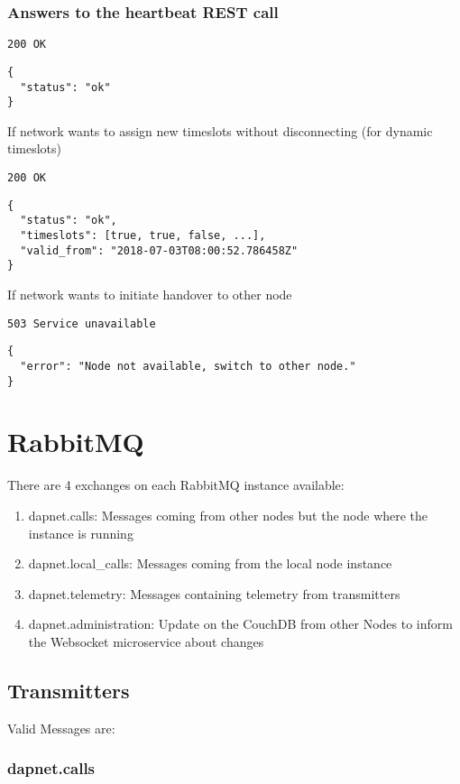 \subsubsection{Answers to the heartbeat REST call}
\texttt{200 OK}
\begin{lstlisting}
{
  "status": "ok"
}
\end{lstlisting}

If network wants to assign new timeslots without disconnecting (for dynamic timeslots)

\texttt{200 OK}
\begin{lstlisting}
{
  "status": "ok",
  "timeslots": [true, true, false, ...],
  "valid_from": "2018-07-03T08:00:52.786458Z"
}
\end{lstlisting}

If network wants to initiate handover to other node

\texttt{503 Service unavailable}
\begin{lstlisting}
{
  "error": "Node not available, switch to other node."
}
\end{lstlisting}

\section{RabbitMQ}
\label{protocoldef:RabbitMQ}
There are 4 exchanges on each RabbitMQ instance available:
\begin{enumerate}
\item dapnet.calls: Messages coming from other nodes but the node where the instance is running
\item dapnet.local\_calls: Messages coming from the local node instance
\item dapnet.telemetry: Messages containing telemetry from transmitters
\item dapnet.administration: Update on the CouchDB from other Nodes to inform the Websocket microservice about changes
\end{enumerate}


\subsection{Transmitters}
\label{protocoldef:RabbitMQ:Transmitters}

Valid Messages are:

\subsubsection{dapnet.calls}
\label{protocoldef:RabbitMQ:dapnet.calls}



